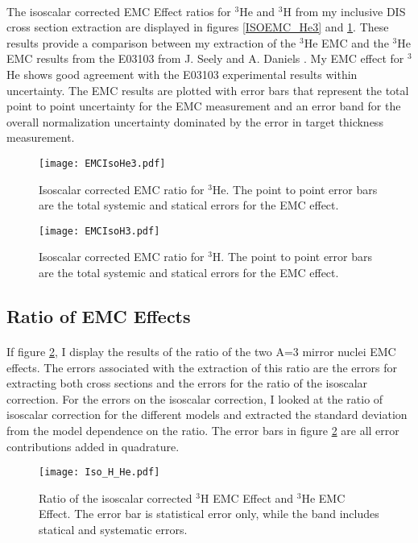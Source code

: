 \paragraph{}The isoscalar corrected EMC Effect ratios for $^3$He and $^3$H from my inclusive DIS cross section extraction are displayed in figures \ref{ISOEMC_He3} and \ref{ISOEMC_H3}. These results provide a comparison between my extraction of the $^3$He EMC and the $^3$He EMC results from the E03103 from J. Seely and A. Daniels \cite{seeley}. My EMC effect for $^3$He shows good agreement with the E03103 experimental results within uncertainty. The EMC results are plotted with error bars that represent the total point to point uncertainty for the EMC measurement and an error band for the overall normalization uncertainty dominated by the error in target thickness measurement.  
	\begin{figure}[!]
		\texttt{[image: EMCIsoHe3.pdf]}
		\caption{Isoscalar corrected EMC ratio for $^3$He. The point to point error bars are the total systemic and statical errors for the EMC effect.}
		\label{ISOEMC_He3}
	\vspace{1cm}
	\texttt{[image: EMCIsoH3.pdf]}
	\caption{Isoscalar corrected EMC ratio for $^3$H. The point to point error bars are the total systemic and statical errors for the EMC effect.}
	\label{ISOEMC_H3}
\end{figure}

\subsection{Ratio of EMC Effects}
\paragraph{} If figure \ref{ISORatio}, I display the results of the ratio of the two A=3 mirror nuclei EMC effects. The errors associated with the extraction of this ratio are the errors for extracting both cross sections and the errors for the ratio of the isoscalar correction. For the errors on the isoscalar correction, I looked at the ratio of isoscalar correction for the different models and extracted the standard deviation from the model dependence on the ratio. The error bars in figure \ref{ISORatio} are all error contributions added in quadrature. 

\begin{figure}[t]
	\centering
	\texttt{[image: Iso\_H\_He.pdf]}
	\caption{Ratio of the isoscalar corrected  $^3$H EMC Effect and $^3$He EMC Effect. The error bar is statistical error only, while the band includes statical and systematic errors. }\label{ISORatio}
\end{figure}
